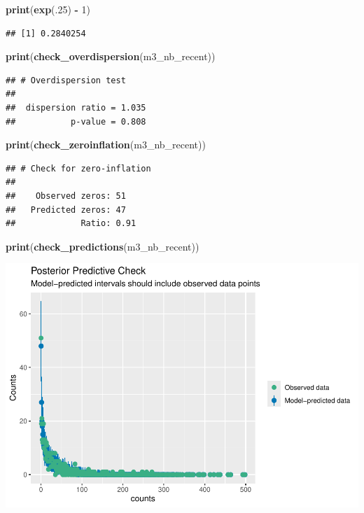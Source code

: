 \documentclass[
]{article}
\newenvironment{Shaded}{\begin{snugshade}}{\end{snugshade}}
\newcommand{\DecValTok}[1]{\textcolor[rgb]{0.00,0.00,0.81}{#1}}
\newcommand{\FunctionTok}[1]{\textcolor[rgb]{0.13,0.29,0.53}{\textbf{#1}}}
\newcommand{\NormalTok}[1]{#1}
\newcommand{\SpecialCharTok}[1]{\textcolor[rgb]{0.81,0.36,0.00}{\textbf{#1}}}
\begin{document}
\begin{Shaded}
\begin{Highlighting}[]
\FunctionTok{print}\NormalTok{(}\FunctionTok{exp}\NormalTok{(.}\DecValTok{25}\NormalTok{) }\SpecialCharTok{{-}} \DecValTok{1}\NormalTok{)}
\end{Highlighting}
\end{Shaded}

\begin{verbatim}
## [1] 0.2840254
\end{verbatim}

\begin{Shaded}
\begin{Highlighting}[]
\FunctionTok{print}\NormalTok{(}\FunctionTok{check\_overdispersion}\NormalTok{(m3\_nb\_recent))}
\end{Highlighting}
\end{Shaded}

\begin{verbatim}
## # Overdispersion test
## 
##  dispersion ratio = 1.035
##           p-value = 0.808
\end{verbatim}

\begin{Shaded}
\begin{Highlighting}[]
\FunctionTok{print}\NormalTok{(}\FunctionTok{check\_zeroinflation}\NormalTok{(m3\_nb\_recent))}
\end{Highlighting}
\end{Shaded}

\begin{verbatim}
## # Check for zero-inflation
## 
##    Observed zeros: 51
##   Predicted zeros: 47
##             Ratio: 0.91
\end{verbatim}

\begin{Shaded}
\begin{Highlighting}[]
\FunctionTok{print}\NormalTok{(}\FunctionTok{check\_predictions}\NormalTok{(m3\_nb\_recent))}
\end{Highlighting}
\end{Shaded}

\includegraphics{hw1-lobstrs-eds241_files/figure-latex/unnamed-chunk-42-1.pdf}
\end{document}
